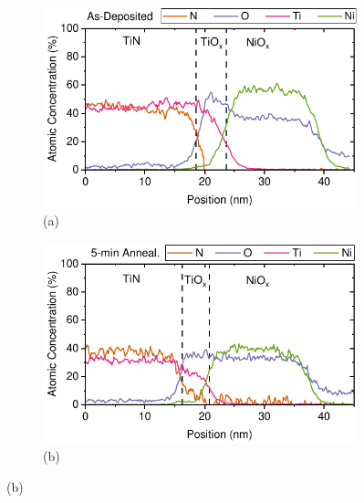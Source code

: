 \begin{figure}[htbp]
    \centering
    \begin{subfigure}[t]{0.49\textwidth}
        \centering
        \includegraphics[width=\textwidth]{chapters/material_properties/images/TEM_As_Dep.pdf} %
        \caption*{(a)}
    \end{subfigure}
    \hfill
    \begin{subfigure}[t]{0.49\textwidth}
        \centering
        \includegraphics[width=\textwidth]{chapters/material_properties/images/TEM_5_min.pdf} %
        \caption*{(b)}
    \end{subfigure}


\end{figure}

